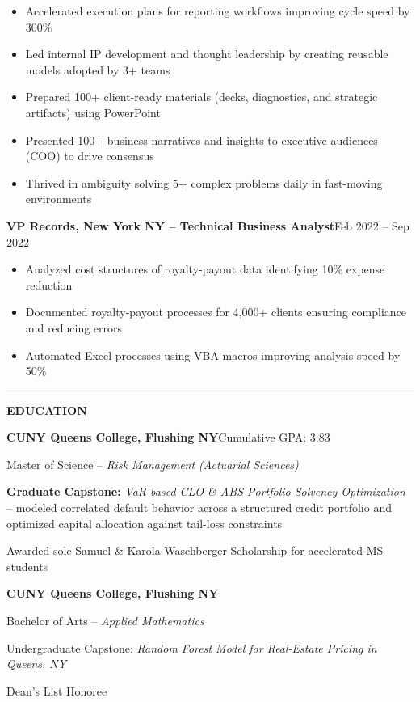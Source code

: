 \documentclass[8pt]{extarticle}
\newcommand{\Section}[1]{%
  \vspace{0.5\baselineskip}\hrule
  \vspace{0.12\baselineskip}%
  \begin{center}\textbf{\scshape #1}\end{center}}
\begin{document}
\begin{itemize}
  \item Accelerated execution plans for reporting workflows improving cycle speed by 300\%
  \item Led internal IP development and thought leadership by creating reusable models adopted by 3+ teams
  \item Prepared 100+ client-ready materials (decks, diagnostics, and strategic artifacts) using PowerPoint
  \item Presented 100+ business narratives and insights to executive audiences (COO) to drive consensus
  \item Thrived in ambiguity solving 5+ complex problems daily in fast-moving environments
\end{itemize}

\vspace{0.25\baselineskip}
\textbf{VP Records, New York NY -- Technical Business Analyst}\hfill Feb 2022 -- Sep 2022
\begin{itemize}
  \item Analyzed cost structures of royalty-payout data identifying 10\% expense reduction
  \item Documented royalty-payout processes for 4,000+ clients ensuring compliance and reducing errors
  \item Automated Excel processes using VBA macros improving analysis speed by 50\%
\end{itemize}

\Section{EDUCATION}

\textbf{CUNY Queens College, Flushing NY}\hfill Cumulative GPA: 3.83\par
Master of Science -- \emph{Risk Management (Actuarial Sciences)}\par
\textbf{Graduate Capstone:} \emph{VaR-based CLO \& ABS Portfolio Solvency Optimization} -- modeled correlated default behavior across a structured credit portfolio and optimized capital allocation against tail-loss constraints\par
Awarded sole Samuel \& Karola Waschberger Scholarship for accelerated MS students\par\vspace{3pt}

\textbf{CUNY Queens College, Flushing NY}\par
Bachelor of Arts -- \emph{Applied Mathematics}\par
Undergraduate Capstone: \emph{Random Forest Model for Real-Estate Pricing in Queens, NY}\par
Dean's List Honoree
\end{document}
